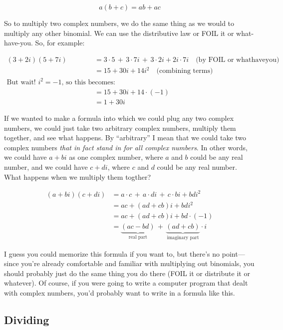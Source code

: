 \documentclass[
]{article}
\begin{document}
\[a(b+c) = ab + ac\]

So to multiply two complex numbers, we do the same thing as we would to
multiply any other binomial. We can use the distributive law or FOIL it
or what-have-you. So, for example:

\[
\begin{align*}(3+2i)(5+7i) &= 3\cdot 5 \,+\, 3\cdot7i\,+\,3\cdot2i + 2i\cdot7i \quad \text{(by FOIL or whathaveyou)} \\
&= 15 + 30i + 14i^2 \quad \text{(combining terms)} \\
\text{But wait! $i^2=-1$, so this becomes:}\\
&= 15 + 30i + 14\cdot(-1) \\
&= 1 + 30i
\end{align*}
\]

If we wanted to make a formula into which we could plug any two complex
numbers, we could just take two arbitrary complex numbers, multiply them
together, and see what happens. By ``arbitrary'' I mean that we could
take two complex numbers \emph{that in fact stand in for all complex
numbers}. In other words, we could have \(a+bi\) as one complex number,
where \(a\) and \(b\) could be any real number, and we could have
\(c+di\), where \(c\) and \(d\) could be any real number. What happens
when we multiply them togther?

\[
\begin{align*}(a+bi)(c+di) &= a\cdot c \,+\, a\cdot di\,+\,c\cdot bi + bdi^2 \\
&= ac + (ad + cb)i + bdi^2  \\
&= ac + (ad + cb)i + bd\cdot(-1) \\
&= \underbrace{(ac-bd)}_{\text{real part}} \,+\,  \underbrace{(ad + cb)}_{\text{imaginary part}}\cdot i
\end{align*}
\]

I guess you could memorize this formula if you want to, but there's no
point---since you're already comfortable and familiar with multiplying
out binomials, you should probably just do the same thing you do there
(FOIL it or distribute it or whatever). Of course, if you were going to
write a computer program that dealt with complex numbers, you'd probably
want to write in a formula like this.

\hypertarget{dividing}{%
\subsection{Dividing}\label{dividing}}
\end{document}

